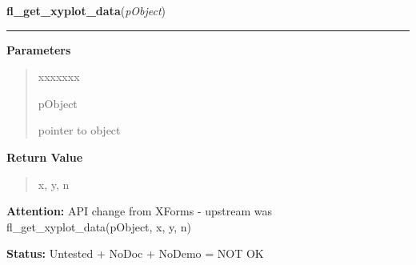 \hspace{.8\funcindent}\begin{boxedminipage}{\funcwidth}

    \raggedright \textbf{fl\_get\_xyplot\_data}(\textit{pObject})

    \vspace{-1.5ex}

    \rule{\textwidth}{0.5\fboxrule}
\setlength{\parskip}{2ex}
\setlength{\parskip}{1ex}
      \textbf{Parameters}
      \vspace{-1ex}

      \begin{quote}
        \begin{Ventry}{xxxxxxx}

          \item[pObject]

          pointer to object

        \end{Ventry}

      \end{quote}

      \textbf{Return Value}
    \vspace{-1ex}

      \begin{quote}
      x, y, n

      \end{quote}

\textbf{Attention:} API change from XForms - upstream was fl\_get\_xyplot\_data(pObject, x, y, 
n)



\textbf{Status:} Untested + NoDoc + NoDemo = NOT OK



    \end{boxedminipage}

    \label{xformslib:library:fl_get_xyplot_data_pointer}

    \vspace{0.5ex}

